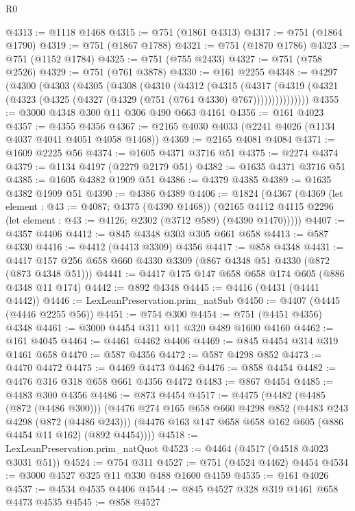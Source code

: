 \begin{lexlean}{R0}
\begin{coremodule}
@4313 := @1118 @1468
@4315 := @751 (@1861 @4313)
@4317 := @751 (@1864 @1790)
@4319 := @751 (@1867 @1788)
@4321 := @751 (@1870 @1786)
@4323 := @751 (@1152 @1784)
@4325 := @751 (@755 @2433)
@4327 := @751 (@758 @2526)
@4329 := @751 (@761 @3878)
@4330 := @161 @2255
@4348 := @4297
    (@4300
      (@4303
        (@4305
          (@4308
            (@4310
              (@4312
                (@4315
                  (@4317
                    (@4319 (@4321 (@4323 (@4325 (@4327 (@4329 (@751 (@764 @4330) @767)))))))))))))))
@4355 := @3000 @4348 @300 @11 @306 @490 @663 @4161
@4356 := @161 @4023
@4357 := @4355 @4356
@4367 := @2165 @4030 @4033 (@2241 @4026 (@1134 @4037 @4041 @4051 @4058 @1468))
@4369 := @2165 @4081 @4084
@4371 := @1609 @2225 @56
@4374 := @1605 @4371 @3716 @51
@4375 := @2274 @4374
@4379 := @1134 @4197 (@2279 @2179 @51)
@4382 := @1635 @4371 @3716 @51
@4385 := @1605 @4382 @1909 @51
@4386 := @4379 @4385
@4389 := @1635 @4382 @1909 @51
@4390 := @4386 @4389
@4406 := @1824
    (@4367
      (@4369
        (let element : @43 := @4087; @4375 (@4390 @1468))
        (@2165 @4112 @4115 @2296 (let element : @43 := @4126; @2302 (@3712 @589) (@4390 @1470)))))
@4407 := @4357 @4406
@4412 := @845 @4348 @303 @305 @661 @658
@4413 := @587 @4330
@4416 := @4412 (@4413 @3309) @4356
@4417 := @858 @4348
@4431 := @4417 @157 @256 @658 @660 @4330 @3309 (@867 @4348 @51 @4330 (@872 (@873 @4348 @51)))
@4441 := @4417 @175 @147 @658 @658 @174 @605 (@886 @4348 @11 @174)
@4442 := @892 @4348
@4445 := @4416 (@4431 (@4441 @4442))
@4446 := LexLeanPreservation.prim_natSub
@4450 := @4407 (@4445 (@4446 @2255 @56))
@4451 := @754 @300
@4454 := @751 (@4451 @4356) @4348
@4461 := @3000 @4454 @311 @11 @320 @489 @1600 @4160
@4462 := @161 @4045
@4464 := @4461 @4462 @4406
@4469 := @845 @4454 @314 @319 @1461 @658
@4470 := @587 @4356
@4472 := @587 @4298 @852
@4473 := @4470 @4472
@4475 := @4469 @4473 @4462
@4476 := @858 @4454
@4482 := @4476 @316 @318 @658 @661 @4356 @4472
@4483 := @867 @4454
@4485 := @4483 @300 @4356
@4486 := @873 @4454
@4517 := @4475
    (@4482
      (@4485 (@872 (@4486 @300)))
      (@4476
        @274
        @165
        @658
        @660
        @4298
        @852
        (@4483 @243 @4298 (@872 (@4486 @243)))
        (@4476 @163 @147 @658 @658 @162 @605 (@886 @4454 @11 @162) (@892 @4454))))
@4518 := LexLeanPreservation.prim_natQuot
@4523 := @4464 (@4517 (@4518 @4023 @3031 @51))
@4524 := @754 @311
@4527 := @751 (@4524 @4462) @4454
@4534 := @3000 @4527 @325 @11 @330 @488 @1600 @4159
@4535 := @161 @4026
@4537 := @4534 @4535 @4406
@4544 := @845 @4527 @328 @319 @1461 @658 @4473 @4535
@4545 := @858 @4527

\end{coremodule}
\end{lexlean}
